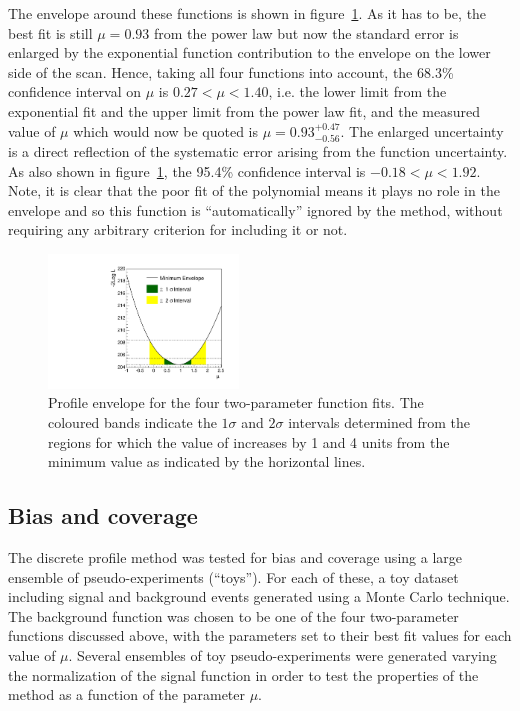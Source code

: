 The envelope around these functions is shown in
figure~\ref{fig:functions:envelope}.
As it has to be, the best fit is still $\mu=0.93$ from the power law
but now the standard error is enlarged by the exponential function
contribution to the
envelope on the lower side of the scan. Hence, taking all four functions into
account, the 68.3\% confidence interval on $\mu$ is
$0.27 < \mu < 1.40 $, i.e. the lower limit from the exponential fit and the
upper limit from the power law fit,
and the measured value of $\mu$ which would now be quoted is 
$\mu = 0.93_{-0.56}^{+0.47}$.
The enlarged uncertainty is a direct reflection of the
systematic error arising from the function uncertainty.
As also shown in figure~\ref{fig:functions:envelope}, the 95.4\% confidence 
interval is $-0.18 < \mu < 1.92$.
Note, it is clear that the poor fit of the polynomial
means it plays no role in the envelope and so this function is 
``automatically'' ignored by the method,
without requiring any arbitrary criterion for
including it or not.
%
\begin{figure}[tbp]
\centering
\includegraphics[width=0.45\textwidth]{functions/Envelope.pdf}
\caption{Profile \nll envelope for the four two-parameter function fits.
The coloured bands indicate the $1\sigma$ and $2\sigma$ intervals determined from the regions 
for which the value of \nll increases by 1 and 4 units from the minimum value as indicated by the horizontal lines.}
\label{fig:functions:envelope}
\end{figure}


\subsection{Bias and coverage}
\label{sec:functions:coverage}

The discrete profile method was tested for bias and coverage 
using a large ensemble of
pseudo-experiments (``toys''). For each of these, a toy
dataset including signal and background events generated using a Monte Carlo technique. 
The background function was chosen to be one of the four two-parameter functions discussed above, with
the parameters set to their best fit values for each value of $\mu$.
Several ensembles of toy pseudo-experiments were 
generated varying the normalization of the signal function in order to test the properties 
of the method as a function of the parameter $\mu$.  

